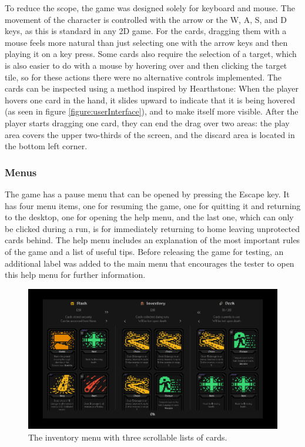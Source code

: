 To reduce the scope, the game was designed solely for keyboard and mouse. The movement of the character is controlled with the arrow or the W, A, S, and D keys, as this is standard in any 2D game. For the cards, dragging them with a mouse feels more natural than just selecting one with the arrow keys and then playing it on a key press. Some cards also require the selection of a target, which is also easier to do with a mouse by hovering over and then clicking the target tile, so for these actions there were no alternative controls implemented. The cards can be inspected using a method inspired by Hearthstone\cite{hearthstone2014}: When the player hovers one card in the hand, it slides upward to indicate that it is being hovered (as seen in figure \ref{figure:userInterface}), and to make itself more visible. After the player starts dragging one card, they can end the drag over two areas: the play area covers the upper two-thirds of the screen, and the discard area is located in the bottom left corner.



\subsubsection{Menus}

The game has a pause menu that can be opened by pressing the Escape key. It has four menu items, one for resuming the game, one for quitting it and returning to the desktop, one for opening the help menu, and the last one, which can only be clicked during a run, is for immediately returning to home leaving unprotected cards behind. The help menu includes an explanation of the most important rules of the game and a list of useful tips. Before releasing the game for testing, an additional label was added to the main menu that encourages the tester to open this help menu for further information.

\begin{figure}[h]
    \centering
    \includegraphics[width=\textwidth]{images/inventory.png} 
    \caption{The inventory menu with three scrollable lists of cards.}
    \label{figure:inventoryMenu}
\end{figure}


